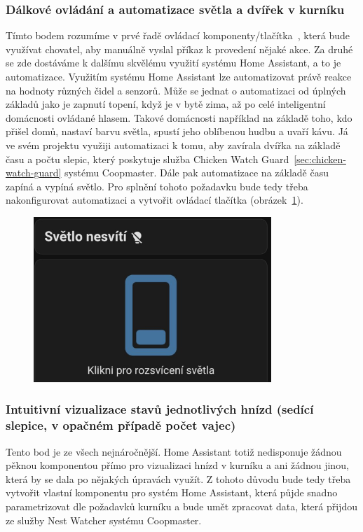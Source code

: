 \subsubsection*{Dálkové ovládání a automatizace světla a dvířek v kurníku}
Tímto bodem rozumíme v prvé řadě ovládací komponenty/tlačítka~\cite{HomeAssistantButtonCard}, která bude využívat chovatel, aby manuálně vyslal příkaz k provedení nějaké akce.
Za druhé se zde dostáváme k dalšímu skvělému využití systému Home Assistant, a to je automatizace.
Využitím systému Home Assistant lze automatizovat právě reakce na hodnoty různých čidel a senzorů.
Může se jednat o automatizaci od úplných základů jako je zapnutí topení, když je v bytě zima, až po celé inteligentní domácnosti ovládané hlasem.
Takové domácnosti například na základě toho, kdo přišel domů, nastaví barvu světla, spustí jeho oblíbenou hudbu a uvaří kávu.
Já ve svém projektu využiji automatizaci k tomu, aby zavírala dvířka na základě času a počtu slepic, který poskytuje služba Chicken Watch Guard~\ref{sec:chicken-watch-guard} systému Coopmaster.
Dále pak automatizace na základě času zapíná a vypíná světlo.\newline
Pro splnění tohoto požadavku bude tedy třeba nakonfigurovat automatizaci a vytvořit ovládací tlačítka (obrázek~\ref{fig:homeassitant_lamp_button}).

\begin{figure}[H]
    \centering
    \includegraphics[width=0.8\textwidth]{img/homeasistant_lamp_button}
    \label{fig:homeassitant_lamp_button}
\end{figure}

\subsubsection*{Intuitivní vizualizace stavů jednotlivých hnízd (sedící slepice, v opačném případě počet vajec)}
Tento bod je ze všech nejnáročnější.
Home Assistant totiž nedisponuje žádnou pěknou komponentou přímo pro vizualizaci hnízd v kurníku a ani žádnou jinou, která by se dala po nějakých úpravách využít.\newline
Z tohoto důvodu bude tedy třeba vytvořit vlastní komponentu pro systém Home Assistant, která půjde snadno parametrizovat dle požadavků kurníku a bude umět zpracovat data, která přijdou ze služby Nest Watcher systému Coopmaster.

